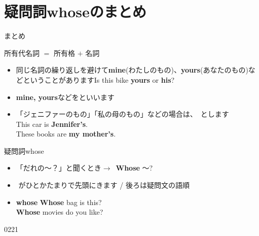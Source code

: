 \documentclass[aspectratio=169,xcolor={dvipsnames,table}]{beamer}
\begin{document}
\section{疑問詞whoseのまとめ}
\begin{frame}[plain]{まとめ}
 \begin{block}{所有代名詞 $=$ 所有格 $+$ 名詞}
\begin{itemize}[square]\small
 \item 同じ名詞の繰り返しを避けて\textbf{mine}(わたしのもの)、\textbf{yours}(あなたのもの)などということがあります\hfill{\scriptsize Is this bike {\bfseries yours} or {\bfseries his}?}
 \item \textbf{mine, yours}などをといいます
 \item 「ジェニファーのもの」「私の母のもの」などの場合は、
\,とします\\
\hfill{\scriptsize This car is {\bfseries Jennifer's}.}\\
\hfill{\scriptsize These books are {\bfseries my mother's}.}
\end{itemize}
     \end{block}
\pause
\begin{block}{疑問詞whose }
\begin{itemize}[square]\small
 \item 「だれの～？」と聞くとき$\longrightarrow$\,\,\,{\bfseries Whose} 〜?
 \item  {}\,\,がひとかたまりで先頭にきます / 後ろは疑問文の語順
 \item {\bfseries whose} \hfill{\scriptsize {\bfseries Whose} bag is this?}\\\hfill{\scriptsize {\bfseries Whose} movies do you like?}
\end{itemize}
     \end{block}
\hfill{\tiny 0221}\,{\scriptsize {}}

\end{frame}
\end{document}
